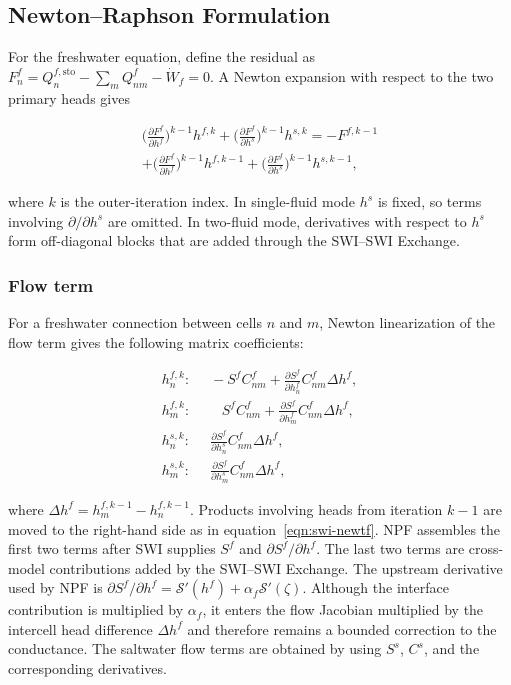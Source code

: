 \subsection{Newton--Raphson Formulation}

For the freshwater equation, define the residual as $F_{n}^{f}=Q_{n}^{f,\mathrm{sto}}-\sum_{m}Q_{nm}^{f}-\dot W_{f}=0$. A Newton expansion with respect to the two primary heads gives

\begin{multline}
\label{eqn:swi-newtf}
\Big(\tfrac{\partial F^{f}}{\partial h^{f}}\Big)^{\!k-1}\!h^{f,k}
+\Big(\tfrac{\partial F^{f}}{\partial h^{s}}\Big)^{\!k-1}\!h^{s,k}
=-F^{f,k-1}\\
+\Big(\tfrac{\partial F^{f}}{\partial h^{f}}\Big)^{\!k-1}\!h^{f,k-1}
+\Big(\tfrac{\partial F^{f}}{\partial h^{s}}\Big)^{\!k-1}\!h^{s,k-1},
\end{multline}

\noindent where $k$ is the outer-iteration index. In single-fluid mode $h^{s}$ is fixed, so terms involving $\partial/\partial h^{s}$ are omitted. In two-fluid mode, derivatives with respect to $h^{s}$ form off-diagonal blocks that are added through the SWI--SWI Exchange.

\subsubsection{Flow term}

For a freshwater connection between cells $n$ and $m$, Newton linearization of the flow term gives the following matrix coefficients:

\begin{align}
\label{eqn:swi-fnflow}
h_{n}^{f,k}:&\;\;
-S^{f}C_{nm}^{f}+\frac{\partial S^{f}}{\partial h_{n}^{f}}C_{nm}^{f}\Delta h^{f},\\
h_{m}^{f,k}:&\;\;
\;\;\;S^{f}C_{nm}^{f}+\frac{\partial S^{f}}{\partial h_{m}^{f}}C_{nm}^{f}\Delta h^{f},\\
h_{n}^{s,k}:&\;\;
\frac{\partial S^{f}}{\partial h_{n}^{s}}C_{nm}^{f}\Delta h^{f},\\
h_{m}^{s,k}:&\;\;
\frac{\partial S^{f}}{\partial h_{m}^{s}}C_{nm}^{f}\Delta h^{f},
\end{align}

\noindent where $\Delta h^{f}=h_{m}^{f,k-1}-h_{n}^{f,k-1}$. Products involving heads from iteration $k-1$ are moved to the right-hand side as in equation~\ref{eqn:swi-newtf}. NPF assembles the first two terms after SWI supplies $S^{f}$ and $\partial S^{f}/\partial h^{f}$. The last two terms are cross-model contributions added by the SWI--SWI Exchange. The upstream derivative used by NPF is $\partial S^{f}/\partial h^{f}=\mathcal{S}'(h^{f})+\alpha_{f}\mathcal{S}'(\zeta)$. Although the interface contribution is multiplied by $\alpha_{f}$, it enters the flow Jacobian multiplied by the intercell head difference $\Delta h^{f}$ and therefore remains a bounded correction to the conductance. The saltwater flow terms are obtained by using $S^{s}$, $C^{s}$, and the corresponding derivatives.


